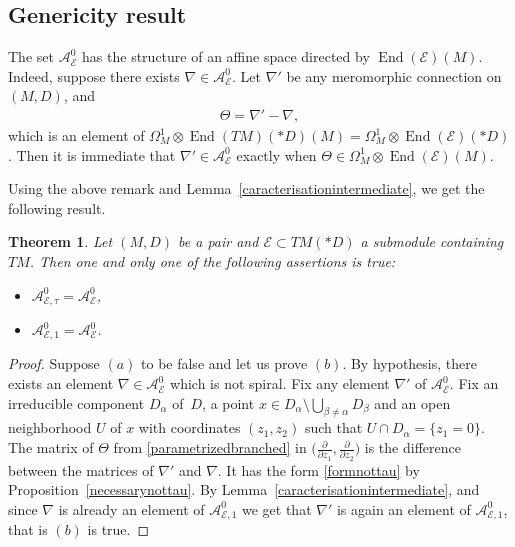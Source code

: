\documentclass[10pt,a4paper]{amsart}
\newcommand{\der}[2]{\frac{\partial #1}{\partial#2}}
\numberwithin{equation}{section}
\newtheorem{Theorem}{Theorem}[section]
\begin{document}
\subsection{Genericity result}
The set $\mathcal{A}^0_\mathcal{E}$ has the structure of an affine space directed by $\operatorname{End}(\mathcal{E})(M)$. Indeed, suppose there exists $\nabla \in \mathcal{A}^0_\mathcal{E}$. Let $\nabla'$ be any meromorphic connection on $(M,D)$, and
 \begin{gather}\label{parametrizedbranched} \Theta = \nabla' - \nabla, \end{gather}
 which is an element of $\Omega^1_M\otimes \operatorname{End}(TM)(* D)(M) = \Omega^1_M\otimes \operatorname{End}(\mathcal{E})(* D)$. Then it is immediate that $\nabla' \in \mathcal{A}^0_\mathcal{E}$ exactly when $\Theta\in \Omega^1_M\otimes \operatorname{End}(\mathcal{E})(M)$.

Using the above remark and Lemma~\ref{caracterisationintermediate}, we get the following result.

\begin{Theorem}\label{genericity} Let $(M,D)$ be a pair and $\mathcal{E}\subset TM(* D)$ a submodule containing $TM$. Then one and only one of the following assertions is true: \begin{itemize}\itemsep=0pt
 \item[$(a)$] $\mathcal{A}^0_{\mathcal{E},\tau}=\mathcal{A}^0_\mathcal{E}$,
\item[$(b)$] $\mathcal{A}^0_{\mathcal{E},1}=\mathcal{A}^0_\mathcal{E}$.
\end{itemize} \end{Theorem}
\begin{proof}
Suppose $(a)$ to be false and let us prove $(b)$. By hypothesis, there exists an element $\nabla\in \mathcal{A}^0_\mathcal{E}$ which is not spiral. Fix any element $\nabla'$ of $\mathcal{A}^0_\mathcal{E}$. Fix an irreducible component $D_\alpha$ of~$D$, a point $x\in D_\alpha \setminus \bigcup_{\beta\neq\alpha} D_\beta$ and an open neighborhood $U$ of $x$ with coordinates $(z_1,z_2)$ such that $U\cap D_\alpha = \{z_1=0\}$. The matrix of $\Theta$ from \eqref{parametrizedbranched} in $\big(\der{}{z_1},\der{}{z_2}\big)$ is the difference between the matrices of $\nabla'$ and $\nabla$. It has the form \eqref{formnottau} by Proposition~\ref{necessarynottau}. By Lemma~\ref{caracterisationintermediate}, and since $\nabla$ is already an element of $\mathcal{A}^0_{\mathcal{E},1}$ we get that $\nabla'$ is again an element of $\mathcal{A}^0_{\mathcal{E},1}$, that is $(b)$ is true.
\end{proof}
\end{document}
